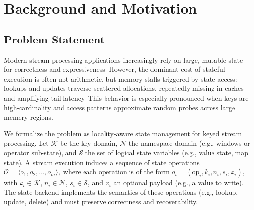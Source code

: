 \documentclass[sigconf]{acmart}
\begin{document}
\section{Background and Motivation}
\subsection{Problem Statement}
Modern stream processing applications increasingly rely on large, mutable state for correctness and expressiveness.
However, the dominant cost of stateful execution is often not arithmetic, but memory stalls triggered by state access: lookups and updates traverse scattered allocations, repeatedly missing in caches and amplifying tail latency.
This behavior is especially pronounced when keys are high-cardinality and access patterns approximate random probes across large memory regions.

We formalize the problem as locality-aware state management for keyed stream processing.
Let $\mathcal{K}$ be the key domain, $\mathcal{N}$ the namespace domain (e.g., windows or operator sub-state), and $\mathcal{S}$ the set of logical state variables (e.g., value state, map state).
A stream execution induces a sequence of state operations
\(
\mathcal{O} = \langle o_1, o_2, \dots, o_m \rangle,
\)
where each operation is of the form
\(
o_i = (\mathrm{op}_i, k_i, n_i, s_i, x_i),
\)
with $k_i\in\mathcal{K}$, $n_i\in\mathcal{N}$, $s_i\in\mathcal{S}$, and $x_i$ an optional payload (e.g., a value to write).
The state backend implements the semantics of these operations (e.g., lookup, update, delete) and must preserve correctness and recoverability.
\end{document}
